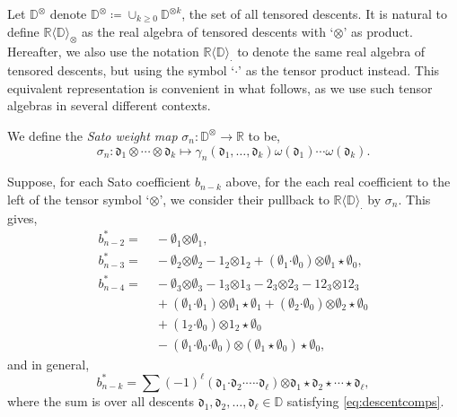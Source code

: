 \documentclass[5p,twocolumn]{elsarticle}
\newcommand*{\R}{\mathbb R}
\newcommand*{\df}{\mathfrak d}
\newcommand*{\cendot}{\boldsymbol{\cdot}}
\newcommand*{\botimes}{\boldsymbol{\otimes}}
\begin{document}
Let $\mathbb D^{\otimes}$ denote $\mathbb D^\otimes\coloneqq\cup_{k\geqslant0}\mathbb D^{\otimes k}$, the set of all tensored descents.
It is natural to define $\R\langle\mathbb D\rangle_{\otimes}$ as the real algebra of tensored descents with `$\otimes$' as product.
Hereafter, we also use the notation $\R\langle\mathbb D\rangle_{\cendot}$ to denote the same real algebra of tensored descents, but using the symbol `$\cendot$' as the tensor product instead.
This equivalent representation is convenient in what follows, as we use such tensor algebras in several different contexts.
%
\begin{definition}\label{def:Satoweightmap}
We define the \emph{Sato weight map} $\sigma_n\colon\mathbb D^{\otimes}\to\R$ to be,
\begin{equation}\label{eq:sigmadef}
   \sigma_n\colon\df_1\otimes\cdots\otimes\df_k\mapsto\gamma_n(\df_1,\ldots,\df_k)\omega(\df_1)\cdots\omega(\df_k).
\end{equation}
\end{definition}
%
Suppose, for each Sato coefficient $b_{n-k}$ above, for the each real coefficient to the left of the tensor symbol `$\botimes$', we consider their pullback to $\R\langle\mathbb D\rangle_{\cendot}$ by $\sigma_n$.
This gives,
\begin{align*}
  b^\ast_{n-2}=&\;-\emptyset_1\botimes\emptyset_1,\\
  b^\ast_{n-3}=&\;-\emptyset_2\botimes\emptyset_2-1_2\botimes1_2+(\emptyset_1\cendot\emptyset_0)\botimes\emptyset_1\star\emptyset_0,\\
  b^\ast_{n-4}=&\;-\emptyset_3\botimes\emptyset_3-1_3\botimes1_3-2_3\botimes2_3-12_3\botimes12_3\\
         &\;+(\emptyset_1\cendot\emptyset_1)\botimes\emptyset_1\star\emptyset_1+(\emptyset_2\cendot\emptyset_0)\botimes\emptyset_2\star\emptyset_0\\
         &\;+(1_2\cendot\emptyset_0)\botimes1_2\star\emptyset_0\\
         &\;-(\emptyset_1\cendot\emptyset_0\cendot\emptyset_0)\botimes(\emptyset_1\star\emptyset_0)\star\emptyset_0,
\end{align*}
and in general,
\begin{equation}\label{eq:bnkformula}
  b_{n-k}^\ast\!=\!\!\sum(-1)^\ell(\df_1\cendot\df_2\cendot\cdots\cendot\df_\ell)\botimes\df_1\star\df_2\star\cdots\star\df_\ell,
\end{equation}
where the sum is over all descents $\df_1,\df_2,\ldots,\df_\ell\in\mathbb D$ satisfying \eqref{eq:descentcomps}.
\end{document}
